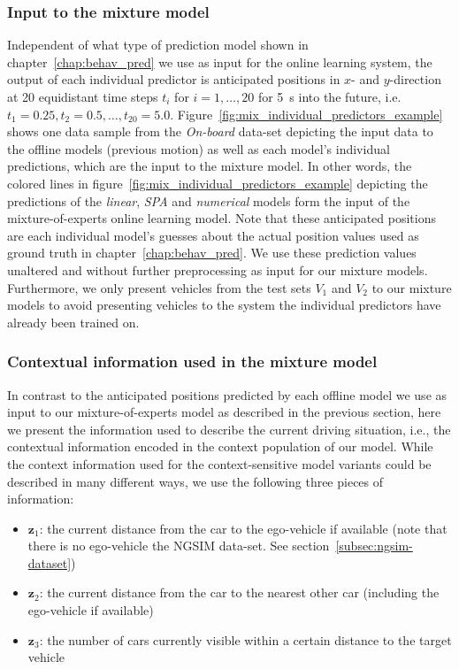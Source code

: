 \subsubsection{Input to the mixture model}%
\label{ssubsec:input_to_the_mixture_model}


Independent of what type of prediction model shown in chapter~\ref{chap:behav_pred} we use as input for the online learning system, the output of each individual predictor is anticipated positions in $x$- and $y$-direction at \num{20} equidistant time steps $t_i$ for $i=1,\ldots,20$ for \SI{5}{\second} into the future, i.e.\ $t_1=0.25, t_2=0.5, \ldots, t_{20}=5.0$.
Figure~\ref{fig:mix_individual_predictors_example} shows one data sample from the \emph{On-board} data-set depicting the input data to the offline models (previous motion) as well as each model's individual predictions, which are the input to the mixture model. 
In other words, the colored lines in figure~\ref{fig:mix_individual_predictors_example} depicting the predictions of the \emph{linear}, \emph{\ac{SPA}} and \emph{numerical} models form the input of the mixture-of-experts online learning model.
Note that these anticipated positions are each individual model's guesses about the actual position values used as ground truth in chapter~\ref{chap:behav_pred}.
We use these prediction values unaltered and without further preprocessing as input for our mixture models.
Furthermore, we only present vehicles from the test sets $V_1$ and $V_2$ to our mixture models to avoid presenting vehicles to the system the individual predictors have already been trained on.

\subsubsection{Contextual information used in the mixture model}%
\label{ssubsec:contextual_information_used_in_the_mixture_model}

In contrast to the anticipated positions predicted by each offline model we use as input to our mixture-of-experts model as described in the previous section, here we present the information used to describe the current driving situation, i.e., the contextual information encoded in the context population of our model.
While the context information used for the context-sensitive model variants could be described in many different ways, we use the following three pieces of information:

\begin{itemize}
    \item{$\mathbf{z}_1$: the current distance from the car to the ego-vehicle if available (note that there is no ego-vehicle the \ac{NGSIM} data-set. See section~\ref{subsec:ngsim-dataset})}
\item{$\mathbf{z}_2$: the current distance from the car to the nearest other car (including
    the ego-vehicle if available)}
\item{$\mathbf{z}_3$: the number of cars currently visible within a certain distance to the target vehicle}
\end{itemize}

